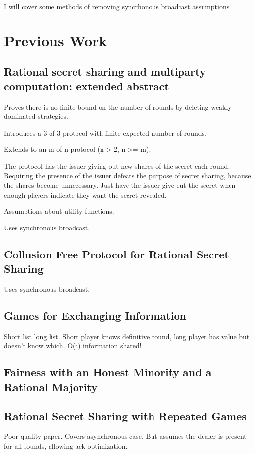 \documentclass{article}
\begin{document}
I will cover some methods of removing syncrhonous broadcast assumptions.

\section{Previous Work}
\subsection{Rational secret sharing and multiparty computation: extended abstract}
Proves there is no finite bound on the number of rounds by deleting weakly dominated strategies.

Introduces a 3 of 3 protocol with finite expected number of rounds.

Extends to an m of n protocol (n > 2, n >= m).

The protocol has the issuer giving out new shares of the secret each round. Requiring the presence of the issuer defeats the purpose of secret sharing, because the shares become unnecessary. Just have the issuer give out the secret when enough players indicate they want the secret revealed.

Assumptions about utility functions.

Uses synchronous broadcast.

\subsection{Collusion Free Protocol for Rational Secret Sharing}

Uses synchronous broadcast.

\subsection{Games for Exchanging Information}

Short list long list. Short player knows definitive round, long player has value but doesn't know which. O(t) information shared!

\subsection{Fairness with an Honest Minority and a Rational Majority}

\subsection{Rational Secret Sharing with Repeated Games}
Poor quality paper.
Covers asynchronous case.
But assumes the dealer is present for all rounds, allowing ack optimization.
\end{document}
